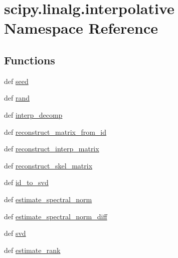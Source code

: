 \hypertarget{namespacescipy_1_1linalg_1_1interpolative}{}\section{scipy.\+linalg.\+interpolative Namespace Reference}
\label{namespacescipy_1_1linalg_1_1interpolative}
\subsection*{Functions}
\begin{DoxyCompactItemize}
\item 
def \hyperlink{namespacescipy_1_1linalg_1_1interpolative_aca9c667218677ace50bc00224f2e42ca}{seed}
\item 
def \hyperlink{namespacescipy_1_1linalg_1_1interpolative_ad89ebf29a1d595592b6495fbf642a372}{rand}
\item 
def \hyperlink{namespacescipy_1_1linalg_1_1interpolative_a7e0d99cb8e077e6ed3463c1cef8af58c}{interp\+\_\+decomp}
\item 
def \hyperlink{namespacescipy_1_1linalg_1_1interpolative_a31e4297d91e2ce258ff27956302490b7}{reconstruct\+\_\+matrix\+\_\+from\+\_\+id}
\item 
def \hyperlink{namespacescipy_1_1linalg_1_1interpolative_a3db48f192ba388b6d5cacafdd3d06129}{reconstruct\+\_\+interp\+\_\+matrix}
\item 
def \hyperlink{namespacescipy_1_1linalg_1_1interpolative_a98c420fe02504293ddad029bc23eebe9}{reconstruct\+\_\+skel\+\_\+matrix}
\item 
def \hyperlink{namespacescipy_1_1linalg_1_1interpolative_a0f6e062a7faa2169d3dc54e20ac0ea1b}{id\+\_\+to\+\_\+svd}
\item 
def \hyperlink{namespacescipy_1_1linalg_1_1interpolative_a722ea469f4b2d7c48a18da2dde6e14a5}{estimate\+\_\+spectral\+\_\+norm}
\item 
def \hyperlink{namespacescipy_1_1linalg_1_1interpolative_a5eb388ccc6d3622c26aa7e99c7526c8a}{estimate\+\_\+spectral\+\_\+norm\+\_\+diff}
\item 
def \hyperlink{namespacescipy_1_1linalg_1_1interpolative_a61ede274e125088f8db231b613a47320}{svd}
\item 
def \hyperlink{namespacescipy_1_1linalg_1_1interpolative_a8fbeca3cfa57ca575a66f35299dbe07d}{estimate\+\_\+rank}
\end{DoxyCompactItemize}
